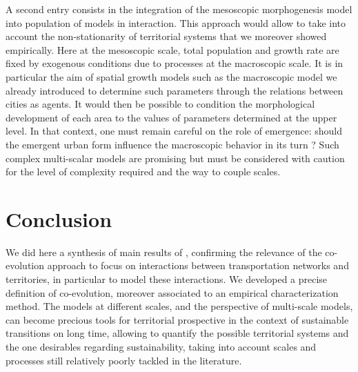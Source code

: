 \documentclass[11pt]{article}
\begin{document}
A second entry consists in the integration of the mesoscopic morphogenesis model into population of models in interaction. This approach would allow to take into account the non-stationarity of territorial systems that we moreover showed empirically. Here at the mesoscopic scale, total population and growth rate are fixed by exogenous conditions due to processes at the macroscopic scale. It is in particular the aim of spatial growth models such as the macroscopic model we already introduced to determine such parameters through the relations between cities as agents. It would then be possible to condition the morphological development of each area to the values of parameters determined at the upper level. In that context, one must remain careful on the role of emergence: should the emergent urban form influence the macroscopic behavior in its turn ? Such complex multi-scalar models are promising but must be considered with caution for the level of complexity required and the way to couple scales.


\section{Conclusion}

We did here a synthesis of main results of \cite{raimbault2018caracterisation}, confirming the relevance of the co-evolution approach to focus on interactions between transportation networks and territories, in particular to model these interactions. We developed a precise definition of co-evolution, moreover associated to an empirical characterization method. The models at different scales, and the perspective of multi-scale models, can become precious tools for territorial prospective in the context of sustainable transitions on long time, allowing to quantify the possible territorial systems and the one desirables regarding sustainability, taking into account scales and processes still relatively poorly tackled in the literature.
\end{document}

